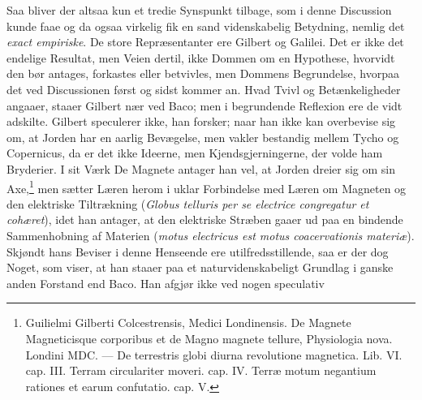 \documentclass[12pt,a4paper]{book}
\begin{document}
Saa bliver der altsaa kun et tredie Synspunkt tilbage, som i denne
Discussion kunde faae og da ogsaa virkelig fik en sand videnskabelig
Betydning, nemlig det \emph{exact empiriske}. De store Repræsentanter
ere Gilbert og Galilei. Det er ikke det endelige Resultat, men Veien
dertil, ikke Dommen om en Hypothese, hvorvidt den bør antages,
forkastes eller betvivles, men Dommens Begrundelse, hvorpaa det ved
Discussionen først og sidst kommer an. Hvad Tvivl og Betænkeligheder
angaaer, staaer Gilbert nær ved Baco; men i begrundende Reflexion ere
de vidt adskilte. Gilbert speculerer ikke, han forsker; naar han ikke
kan overbevise sig om, at Jorden har en aarlig Bevægelse, men vakler
bestandig mellem Tycho og Copernicus, da er det ikke Ideerne, men
Kjendsgjerningerne, der volde ham Bryderier. I sit Værk De Magnete
antager han vel, at Jorden dreier sig om sin Axe,\footnote{%
Guilielmi Gilberti Colcestrensis, Medici Londinensis. De Magnete
Magneticisque corporibus et de Magno magnete tellure, Physiologia nova.
Londini MDC. --- De terrestris globi diurna revolutione magnetica. Lib.
VI. cap. III. Terram circulariter moveri. cap. IV. Terræ motum
negantium rationes et earum confutatio. cap. V.} men sætter Læren
herom i uklar Forbindelse med Læren om Magneten og den elektriske
Tiltrækning (\textit{Globus telluris per se electrice congregatur et
cohæret}), idet han antager, at den elektriske Stræben gaaer ud paa en
bindende Sammenhobning af Materien (\textit{motus electricus est motus
coacervationis materiæ}). Skjøndt hans Beviser i denne Henseende ere
utilfredsstillende, saa er der dog Noget, som viser, at han staaer paa
et naturvidenskabeligt Grundlag i ganske
anden Forstand end Baco. Han afgjør ikke ved nogen speculativ
\end{document}
